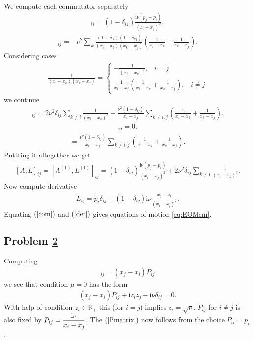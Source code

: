\documentclass[12pt]{article}
\numberwithin{equation}{section}
\theoremstyle{definition}
\newcommand {\ii} {\mathrm{i}}
\newcommand{\myhref}[2]{\hyperref[#1]{#2}}%
\begin{document}
We compute each commutator separately
\begin{align*}
    [A^{(1)}, L^{(1)}]_{ij} = (1 - \delta_{ij})\frac{{\ii}\nu (p_j - p_i)}{(x_i - x_j)^2},
\end{align*}
\begin{align*}
    [A^{(1)}, L^{(2)}]_{ij} = -\nu^2 \sum\limits_{k} \frac{(1- \delta_{ik})(1 - \delta_{kj})}{(x_i - x_k)(x_k - x_j)}\left(\frac{1}{x_i - x_k} - \frac{1}{x_k - x_j}\right).
\end{align*}
Considering cases
\begin{align*}
\frac{1}{(x_i - x_k)(x_k - x_j)} =
    \begin{cases}
        -\frac{1}{(x_i - x_k)^{2}},\;\;\; i = j\\
        \frac{1}{x_i - x_j}\left( \frac{1}{x_i - x_k} + \frac{1}{x_k - x_j} \right) ,\;\;\;i \neq j
    \end{cases}
\end{align*}
we continue
\begin{align*}
    [A^{(1)}, L^{(2)}]_{ij} = 2\nu^2 \delta_{ij} \sum\limits_{k \neq i} \frac{1}{(x_i - x_k)^3} - \frac{\nu^2 (1 - \delta_{ij})}{x_i - x_j} \sum\limits_{k \neq i, j}\left( \frac{1}{x_i - x_k} + \frac{1}{x_k - x_j} \right).
\end{align*}
\begin{align*}
    [A^{(2)}, L^{(1)}]_{ij} = 0.
\end{align*}
\begin{align*}
    [A^{(2)}, L^{(2)}] =  \frac{\nu^2 (1 -\delta_{ij})}{x_i - x_j} \sum\limits_{k \neq i, j}\left( \frac{1}{x_i - x_k} + \frac{1}{x_k - x_j} \right).
\end{align*}
Puttting it altogether we get
\begin{align}\label{com}
    [A, L]_{ij} = [A^{(1)}, L^{(1)}]_{ij} = (1 - \delta_{ij})\frac{{\ii}\nu (p_j - p_i)}{(x_i - x_j)^2} + 2\nu^2 \delta_{ij} \sum\limits_{k \neq i} \frac{1}{(x_i - x_k)^3}.
\end{align}
Now compute derivative
\begin{align}\label{der}
    \dot{L}_{ij} = \dot{p}_{i} \delta_{ij} + (1-\delta_{ij}){\ii}\nu \frac{\dot{x}_{j} - \dot{x}_{i}}{(x_i - x_{j})^2}.
\end{align}
Equating $(\ref{com})$ and $(\ref{der})$ gives equations of motion \eqref{eq:EOMcm}.
\subsection{Problem \myhref{prob2}{2}}
Computing
\begin{align*}
    [P, X]_{ij} = (x_j - x_i)P_{ij}
\end{align*}
we see that condition $\mu = 0$ has the form
\begin{align*}
    (x_j - x_i )P_{ij} + {\ii} z_i z_j - {\ii} \nu \delta_{ij} = 0.
\end{align*}
With help of condition $z_i \in \mathbb{R}_{+}$ this (for $i=j$) implies $z_i = \sqrt{\nu}$. $P_{ij}$ for $i \neq j$ is also fixed by $\displaystyle P_{ij} = \frac{{\ii}\nu}{x_i - x_j} \displaystyle$. The $(\ref{Pmatrix})$ now follows from the choice $P_{ii} = p_i$.
\end{document}
